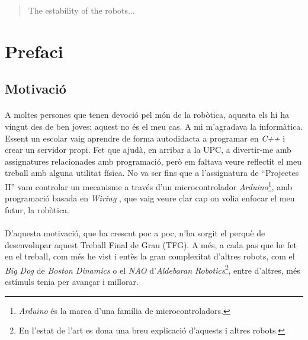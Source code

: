 \documentclass[12pt,a4paper,final,twoside]{article}
\begin{document}
\renewcommand{\abstractname}{Abstract}
\begin{abstract}
The estability of the robots...
\end{abstract}
\newpage
\cleardoublepage

\tableofcontents
\newpage
\listoffigures
\newpage
\listoftables
\newpage



\label{Prefaci}
\section*{Prefaci}

\label{Motivacio}
\subsection*{Motivació}

\paragraph{}A moltes persones que tenen devoció pel món de la robòtica, aquesta els hi ha vingut des de ben joves; aquest no és el meu cas. A mi m'agradava la informàtica. Essent un escolar vaig aprendre de forma autodidacta a programar en \textit{C++} i crear un servidor propi. Fet que ajudà, en arribar a la UPC, a divertir-me amb assignatures relacionades amb programació, però em faltava veure reflectit el meu treball amb alguna utilitat física. No va ser fins que a l'assignatura de ``Projectes II'' vam controlar un mecanisme a través d'un microcontrolador \textit{Arduino}\footnote{\textit{Arduino} és la marca d'una família de microcontroladors.}, amb programació basada en \textit{Wiring} \cite{Arduino}, que vaig veure clar cap on volia enfocar el meu futur, la robòtica.

\paragraph{}D'aquesta motivació, que ha crescut poc a poc, n'ha sorgit el perquè de desenvolupar aquest Treball Final de Grau (TFG). A més, a cada pas que he fet en el treball, com més he vist i entès la gran complexitat d'altres robots, com el \textit{Big Dog} de \textit{Boston Dinamics} o el \textit{NAO} d'\textit{Aldebaran Robotics}\footnote{En l'estat de l'art es dona una breu explicació d'aquests i altres robots.}, entre d'altres, més estímuls tenia per avançar i millorar.
\end{document}
